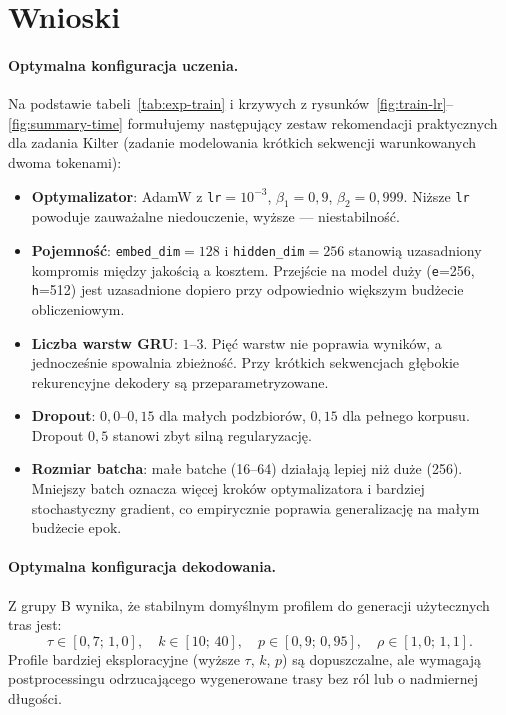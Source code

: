 \documentclass[12pt,a4paper]{article}
\begin{document}
\section{Wnioski}
\label{sec:conclusions}

\paragraph{Optymalna konfiguracja uczenia.}
Na podstawie tabeli~\ref{tab:exp-train} i krzywych z rysunków~\ref{fig:train-lr}--\ref{fig:summary-time} formułujemy następujący zestaw rekomendacji praktycznych dla zadania Kilter (zadanie modelowania krótkich sekwencji warunkowanych dwoma tokenami):
\begin{itemize}[leftmargin=1.5em]
    \item \textbf{Optymalizator}: AdamW z \texttt{lr}$=10^{-3}$, $\beta_1=0{,}9$, $\beta_2=0{,}999$. Niższe \texttt{lr} powoduje zauważalne niedouczenie, wyższe --- niestabilność.
    \item \textbf{Pojemność}: \texttt{embed\_dim}$=128$ i \texttt{hidden\_dim}$=256$ stanowią uzasadniony kompromis między jakością a kosztem. Przejście na model duży (\texttt{e}=256, \texttt{h}=512) jest uzasadnione dopiero przy odpowiednio większym budżecie obliczeniowym.
    \item \textbf{Liczba warstw GRU}: $1$--$3$. Pięć warstw nie poprawia wyników, a jednocześnie spowalnia zbieżność. Przy krótkich sekwencjach głębokie rekurencyjne dekodery są przeparametryzowane.
    \item \textbf{Dropout}: $0{,}0$--$0{,}15$ dla małych podzbiorów, $0{,}15$ dla pełnego korpusu. Dropout $0{,}5$ stanowi zbyt silną regularyzację.
    \item \textbf{Rozmiar batcha}: małe batche (16--64) działają lepiej niż duże (256). Mniejszy batch oznacza więcej kroków optymalizatora i bardziej stochastyczny gradient, co empirycznie poprawia generalizację na małym budżecie epok.
\end{itemize}

\paragraph{Optymalna konfiguracja dekodowania.}
Z grupy B wynika, że stabilnym domyślnym profilem do generacji użytecznych tras jest:
\begin{equation*}
\tau \in [0{,}7;\,1{,}0],\quad k \in [10;\,40],\quad p \in [0{,}9;\,0{,}95],\quad \rho \in [1{,}0;\,1{,}1].
\end{equation*}
Profile bardziej eksploracyjne (wyższe $\tau$, $k$, $p$) są dopuszczalne, ale wymagają postprocessingu odrzucającego wygenerowane trasy bez ról lub o nadmiernej długości.
\end{document}
